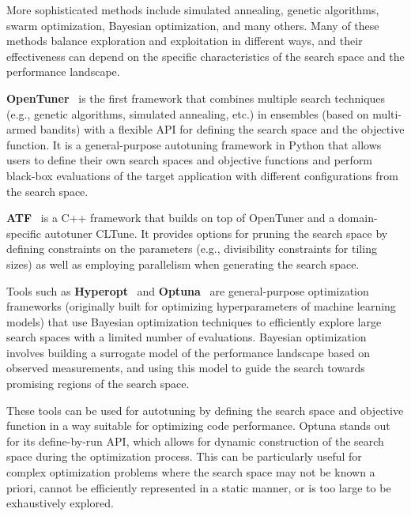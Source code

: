 More sophisticated methods include simulated annealing, genetic algorithms, swarm optimization, Bayesian optimization, and many others. Many of these methods balance exploration and exploitation in different ways, and their effectiveness can depend on the specific characteristics of the search space and the performance landscape.

\textbf{OpenTuner}~\cite{ansel2014opentuner} is the first framework that combines multiple search techniques (e.g., genetic algorithms, simulated annealing, etc.) in ensembles (based on multi-armed bandits) with a flexible API for defining the search space and the objective function. It is a general-purpose autotuning framework in Python that allows users to define their own search spaces and objective functions and perform black-box evaluations of the target application with different configurations from the search space.

\textbf{ATF}~\cite{rasch2018atf} is a C++ framework that builds on top of OpenTuner and a domain-specific autotuner CLTune. It provides options for pruning the search space by defining constraints on the parameters (e.g., divisibility constraints for tiling sizes) as well as employing parallelism when generating the search space.

Tools such as \textbf{Hyperopt}~\cite{bergstra2015hyperopt} and \textbf{Optuna}~\cite{akiba2019optuna} are general-purpose optimization frameworks (originally built for optimizing hyperparameters of machine learning models) that use Bayesian optimization techniques to efficiently explore large search spaces with a limited number of evaluations. Bayesian optimization involves building a surrogate model of the performance landscape based on observed measurements, and using this model to guide the search towards promising regions of the search space.

These tools can be used for autotuning by defining the search space and objective function in a way suitable for optimizing code performance. Optuna stands out for its define-by-run API, which allows for dynamic construction of the search space during the optimization process. This can be particularly useful for complex optimization problems where the search space may not be known a priori, cannot be efficiently represented in a static manner, or is too large to be exhaustively explored.


